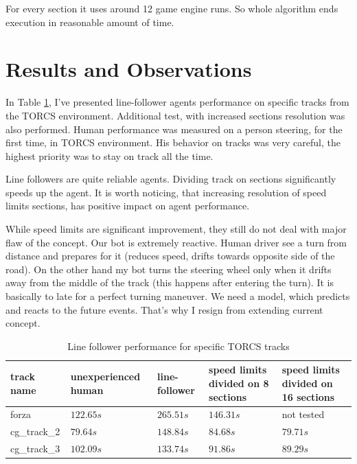 \documentclass[declaration,shortabstract,english,inz]{iithesis}
\begin{document}
For every section it uses around 12 game engine runs.
So whole algorithm ends execution in reasonable amount of time.

\section{Results and Observations}

In Table \ref{tab:line_follower}, I've presented line-follower agents performance on specific tracks from the TORCS environment. Additional test, with increased sections resolution was also performed. Human performance was measured on a person steering, for the first time, in TORCS environment. His behavior on tracks was very careful, the highest priority was to stay on track all the time.

Line followers are quite reliable agents.
Dividing track on sections significantly speeds up the agent.
It is worth noticing, that increasing resolution of speed limits sections, has positive impact on agent performance.


While speed limits are significant improvement, they still do not deal with major flaw of the concept.
Our bot is extremely reactive.
Human driver see a turn from distance and prepares for it (reduces speed, drifts towards opposite side of the road).
On the other hand my bot turns the steering wheel only when it drifts away from the middle of the track (this happens after entering the turn).
It is basically to late for a perfect turning maneuver.
We need a model, which predicts and reacts to the  future events.
That's why I resign from extending current concept.


\begin{table}[h]
    \centering
    \begin{tabular}{ |p{1.7cm}|p{2.5cm}|p{2cm}|p{2.4cm}|p{2.4cm}|}
          \hline
          track name & unexperienced human & line-follower & speed limits divided on 8 sections & speed limits divided on 16 sections  \\
          \hline
          forza &  $122.65s$ & $265.51s$ & $146.31s$ & not tested  \\
          \hline
          cg\_track\_2 & $79.64s$ & $148.84s$ &  $84.68s$ & $79.71s$ \\ 

          \hline
          cg\_track\_3 & $102.09s$ & $133.74s$ & $91.86s$  & $89.29s$  \\
          \hline
    \end{tabular}
        \caption{Line follower performance for specific TORCS tracks}
        \label{tab:line_follower}

\end{table}
\end{document}
